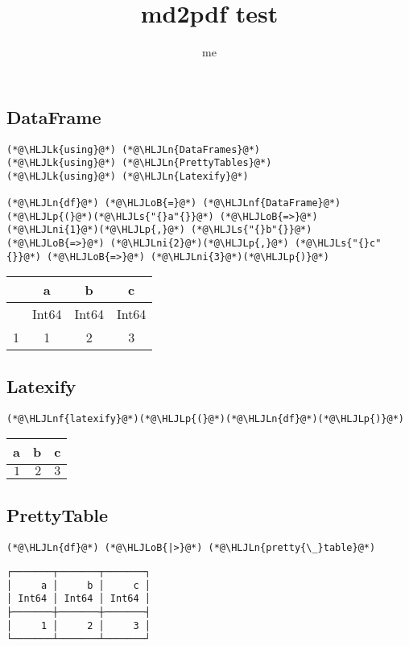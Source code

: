 \documentclass[12pt,a4paper]{article}
\title{ md2pdf test }
\author{ me }
\newcommand{\HLJLk}[1]{\textcolor[RGB]{148,91,176}{\textbf{#1}}}
\newcommand{\HLJLn}[1]{#1}
\newcommand{\HLJLnf}[1]{\textcolor[RGB]{66,102,213}{#1}}
\newcommand{\HLJLs}[1]{\textcolor[RGB]{201,61,57}{#1}}
\newcommand{\HLJLni}[1]{\textcolor[RGB]{59,151,46}{#1}}
\newcommand{\HLJLoB}[1]{\textcolor[RGB]{102,102,102}{\textbf{#1}}}
\newcommand{\HLJLp}[1]{#1}
\begin{document}
\maketitle

\subsection{DataFrame}

\begin{lstlisting}
(*@\HLJLk{using}@*) (*@\HLJLn{DataFrames}@*)
(*@\HLJLk{using}@*) (*@\HLJLn{PrettyTables}@*)
(*@\HLJLk{using}@*) (*@\HLJLn{Latexify}@*)

(*@\HLJLn{df}@*) (*@\HLJLoB{=}@*) (*@\HLJLnf{DataFrame}@*)(*@\HLJLp{(}@*)(*@\HLJLs{"{}a"{}}@*) (*@\HLJLoB{=>}@*) (*@\HLJLni{1}@*)(*@\HLJLp{,}@*) (*@\HLJLs{"{}b"{}}@*) (*@\HLJLoB{=>}@*) (*@\HLJLni{2}@*)(*@\HLJLp{,}@*) (*@\HLJLs{"{}c"{}}@*) (*@\HLJLoB{=>}@*) (*@\HLJLni{3}@*)(*@\HLJLp{)}@*)
\end{lstlisting}


\begin{tabular}{r|ccc}
	& a & b & c\\
	\hline
	& Int64 & Int64 & Int64\\
	\hline
	1 & 1 & 2 & 3 \\
\end{tabular}


\subsection{Latexify}

\begin{lstlisting}
(*@\HLJLnf{latexify}@*)(*@\HLJLp{(}@*)(*@\HLJLn{df}@*)(*@\HLJLp{)}@*)
\end{lstlisting}


\begin{tabular}
{r | r | r}
a & b & c \\
\hline
$1$ & $2$ & $3$ \\
\end{tabular}


\subsection{PrettyTable}

\begin{lstlisting}
(*@\HLJLn{df}@*) (*@\HLJLoB{|>}@*) (*@\HLJLn{pretty{\_}table}@*)
\end{lstlisting}

\begin{lstlisting}
┌───────┬───────┬───────┐
│     a │     b │     c │
│ Int64 │ Int64 │ Int64 │
├───────┼───────┼───────┤
│     1 │     2 │     3 │
└───────┴───────┴───────┘
\end{lstlisting}
\end{document}
